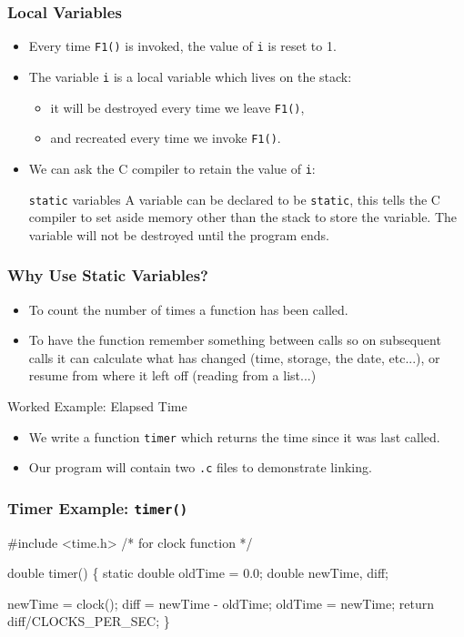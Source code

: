 \documentclass[table]{beamer}
\newif\ifschigh\schighfalse
\newcommand{\kw}[1]{\ifschigh\textcolor{red}{#1}\else\textcolor{keyword}{#1}\fi}
\newcommand{\kt}[1]{\ifschigh\textcolor{red}{#1}\else\textcolor{ctext}{#1}\fi}
\newcommand{\kc}[1]{\ifschigh\textcolor{red}{#1}\else\textcolor{comment}{#1}\fi}
\newcounter{sckll}
\newcommand{\kr}{\setcounter{sckll}{1}}
\newcommand{\kl}{}
\begin{document}
\begin{frame}
\frametitle{Local Variables}
\begin{itemize}
\item Every time {\tt F1()} is invoked, the value of {\tt i} is reset to 1.
\item The variable {\tt i} is a local variable which lives on the stack:
\begin{itemize}
\item it will be destroyed every time we leave {\tt F1()},
\item and recreated every time we invoke {\tt F1()}.
\end{itemize}
\item We can ask the C compiler to retain the value of {\tt i}:
\begin{block}{{\tt static} variables}
A variable can be declared to be \kw{\tt static}, this tells the C compiler to set aside memory other than the stack to store the variable. The variable will not be destroyed until the program ends.
\end{block}
\end{itemize}
\end{frame}

\begin{frame}
\frametitle{Why Use Static Variables?}
\begin{itemize}
\item To count the number of times a function has been called.
\item To have the function remember something between calls so on subsequent calls it can calculate what has changed (time, storage, the date, etc...), or resume from where it left off (reading from a list...)
\end{itemize}

\begin{exampleblock}{Worked Example: Elapsed Time}
\begin{itemize}
\item We write a function {\tt timer} which returns the time since it was last called.
\item Our program will contain two {\tt .c} files to demonstrate linking.
\end{itemize}
\end{exampleblock}
\end{frame}

\begin{frame}[fragile]
\frametitle{Timer Example: {\tt timer()}}
\begin{semiverbatim}
\kr\kl\kw{\#include} \kt{<time.h>} \kc{/* for clock function */}
\kl
\kl\kw{double} timer()
\kl\{
\kl   \kw{static double} oldTime = 0.0;
\kl   \kw{double} newTime, diff;
\kl
\kl   newTime = clock();
\kl   diff = newTime - oldTime;
\kl   oldTime = newTime;
\kl   \kw{return} diff/CLOCKS_PER_SEC;
\kl\}
\end{semiverbatim}
\end{frame}
\end{document}
